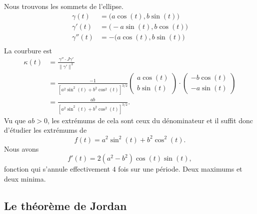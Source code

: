 \begin{example}
	Nous trouvons les sommets de l'ellipse.
	\begin{subequations}
		\begin{align}
			\gamma(t)   & =\big( a\cos(t),b\sin(t) \big)  \\
			\gamma'(t)  & =\big( -a\sin(t),b\cos(t) \big) \\
			\gamma''(t) & =-\big( a\cos(t),b\sin(t) \big) \\
		\end{align}
	\end{subequations}
	La courbure est
	\begin{subequations}
		\begin{align}
			\kappa(t) & =\frac{ \gamma''\cdot J\gamma' }{ \| \gamma' \|^3 }                                                        \\
			          & =\frac{-1}{ [a^2\sin^2(t)+b^2\cos^2(t)]^{3/2} }\begin{pmatrix}
				a\cos(t) \\
				b\sin(t)
			\end{pmatrix}\cdot\begin{pmatrix}
				-b\cos(t) \\
				-a\sin(t)
			\end{pmatrix} \\
			          & =\frac{ ab }{  [a^2\sin^2(t)+b^2\cos^2(t)]^{3/2}  }.
		\end{align}
	\end{subequations}
	Vu que \( ab>0\), les extrémums de cela sont ceux du dénominateur et il suffit donc d'étudier les extrémums de
	\begin{equation}
		f(t)=a^2\sin^2(t)+b^2\cos^2(t).
	\end{equation}
	Nous avons
	\begin{equation}
		f'(t)=2(a^2-b^2)\cos(t)\sin(t),
	\end{equation}
	fonction qui s'annule effectivement \( 4\) fois sur une période. Deux maximums et deux minima.
\end{example}

\subsection{Le théorème de Jordan}


